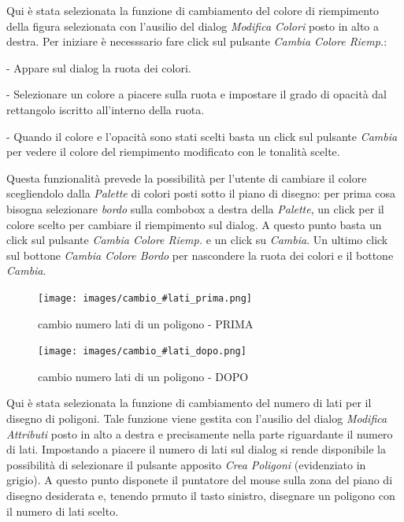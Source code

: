 \vspace{100pt}
Qui \`e stata selezionata la funzione di cambiamento del colore di riempimento della figura selezionata con l'ausilio del dialog \textit{Modifica Colori} posto in alto a destra. Per iniziare \`e necesssario fare click sul pulsante \textit{Cambia Colore Riemp.}: 
\begin{elencopuntato}[\normindent]
\item[-] Appare sul dialog la ruota dei colori.
\item[-] Selezionare un colore a piacere sulla ruota e impostare il grado di opacit\`a dal rettangolo iscritto all'interno della ruota. 
\item[-]Quando il colore e l'opacit\`a sono stati scelti basta un click sul pulsante \textit{Cambia} per vedere il colore del riempimento modificato con le tonalit\`a scelte. 
\end{elencopuntato}
Questa funzionalit\`a prevede la possibilit\`a per l'utente di cambiare il colore scegliendolo dalla \textit{Palette} di colori posti sotto il piano di disegno: per prima cosa bisogna selezionare \textit{bordo} sulla combobox a destra della \textit{Palette}, un click per il colore scelto per cambiare il riempimento sul dialog. A questo punto basta un click sul pulsante \textit{Cambia Colore Riemp.} e un click su \textit{Cambia}.
Un ultimo click sul bottone \textit{Cambia Colore Bordo} per nascondere la ruota dei colori e il bottone \textit{Cambia}.

\begin{figure}[!ht]
\centering
\texttt{[image: images/cambio\_\#lati\_prima.png]}
\caption{cambio numero lati di un poligono  - PRIMA}
\end{figure} 

\begin{figure}[!ht]
\centering
\texttt{[image: images/cambio\_\#lati\_dopo.png]}
\caption{cambio numero lati di un poligono  - DOPO}
\end{figure} 

\vspace{100pt}
Qui \`e stata selezionata la funzione di cambiamento del numero di lati per il disegno di poligoni. Tale funzione viene gestita con l'ausilio del dialog \textit{Modifica Attributi} posto in alto a destra e precisamente nella parte riguardante il numero di lati. Impostando a piacere il numero di lati sul dialog si rende disponibile la possibilit\`a di selezionare il pulsante apposito \textit{Crea Poligoni} (evidenziato in grigio). A questo punto disponete il puntatore del mouse sulla zona del piano di disegno desiderata e, tenendo prmuto il tasto sinistro, disegnare un poligono con il numero di lati scelto.  

